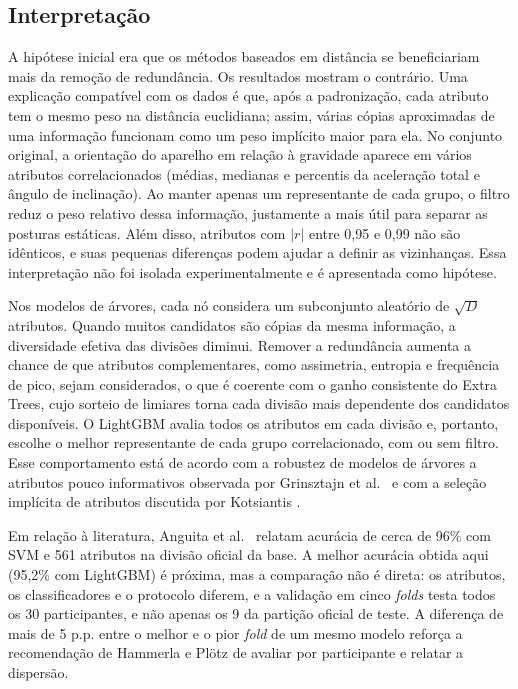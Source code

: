 \documentclass[conference]{IEEEtran}
\begin{document}
\subsection{Interpretação}
A hipótese inicial era que os métodos baseados em distância se beneficiariam mais da remoção de redundância. Os resultados mostram o contrário. Uma explicação compatível com os dados é que, após a padronização, cada atributo tem o mesmo peso na distância euclidiana; assim, várias cópias aproximadas de uma informação funcionam como um peso implícito maior para ela. No conjunto original, a orientação do aparelho em relação à gravidade aparece em vários atributos correlacionados (médias, medianas e percentis da aceleração total e ângulo de inclinação). Ao manter apenas um representante de cada grupo, o filtro reduz o peso relativo dessa informação, justamente a mais útil para separar as posturas estáticas. Além disso, atributos com $|r|$ entre 0,95 e 0,99 não são idênticos, e suas pequenas diferenças podem ajudar a definir as vizinhanças. Essa interpretação não foi isolada experimentalmente e é apresentada como hipótese.

Nos modelos de árvores, cada nó considera um subconjunto aleatório de $\sqrt{D}$ atributos. Quando muitos candidatos são cópias da mesma informação, a diversidade efetiva das divisões diminui. Remover a redundância aumenta a chance de que atributos complementares, como assimetria, entropia e frequência de pico, sejam considerados, o que é coerente com o ganho consistente do Extra Trees, cujo sorteio de limiares torna cada divisão mais dependente dos candidatos disponíveis. O LightGBM avalia todos os atributos em cada divisão e, portanto, escolhe o melhor representante de cada grupo correlacionado, com ou sem filtro. Esse comportamento está de acordo com a robustez de modelos de árvores a atributos pouco informativos observada por Grinsztajn et al.\ \cite{Grinsztajn2022} e com a seleção implícita de atributos discutida por Kotsiantis \cite{Kotsiantis2007}.

Em relação à literatura, Anguita et al.\ \cite{Anguita2013} relatam acurácia de cerca de 96\% com SVM e 561 atributos na divisão oficial da base. A melhor acurácia obtida aqui (95,2\% com LightGBM) é próxima, mas a comparação não é direta: os atributos, os classificadores e o protocolo diferem, e a validação em cinco \textit{folds} testa todos os 30 participantes, e não apenas os 9 da partição oficial de teste. A diferença de mais de 5 p.p. entre o melhor e o pior \textit{fold} de um mesmo modelo reforça a recomendação de Hammerla e Plötz \cite{Hammerla2015} de avaliar por participante e relatar a dispersão.
\end{document}
